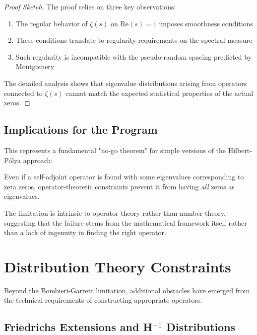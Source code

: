 \begin{proof}[Proof Sketch]
The proof relies on three key observations:
\begin{enumerate}
\item The regular behavior of $\zeta(s)$ on $\text{Re}(s) = 1$ imposes smoothness conditions
\item These conditions translate to regularity requirements on the spectral measure
\item Such regularity is incompatible with the pseudo-random spacing predicted by Montgomery
\end{enumerate}
The detailed analysis shows that eigenvalue distributions arising from operators connected to $\zeta(s)$ cannot match the expected statistical properties of the actual zeros.
\end{proof}

\subsection{Implications for the Program}

This represents a fundamental "no-go theorem" for simple versions of the Hilbert-Pólya approach:

\begin{corollary}[No-Go Result]
\label{cor:no_go}
Even if a self-adjoint operator is found with some eigenvalues corresponding to zeta zeros, operator-theoretic constraints prevent it from having \emph{all} zeros as eigenvalues.
\end{corollary}

The limitation is intrinsic to operator theory rather than number theory, suggesting that the failure stems from the mathematical framework itself rather than a lack of ingenuity in finding the right operator.

\section{Distribution Theory Constraints}
\label{sec:distribution_constraints}

Beyond the Bombieri-Garrett limitation, additional obstacles have emerged from the technical requirements of constructing appropriate operators.

\subsection{Friedrichs Extensions and H$^{-1}$ Distributions}

